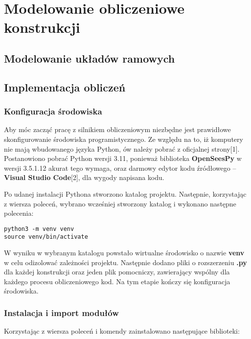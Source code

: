 \newpage
\section{Modelowanie obliczeniowe konstrukcji}

\subsection{Modelowanie układów ramowych}

\subsection{Implementacja obliczeń}
\subsubsection{Konfiguracja środowiska}

Aby móc zacząć pracę z silnikiem obliczeniowym niezbędne jest prawidłowe skonfigurowanie środowiska programistycznego.
Ze względu na to, iż komputery nie mają wbudowanego języka Python, ów należy pobrać z oficjalnej strony[1].
Postanowiono pobrać Python wersji 3.11, ponieważ biblioteka \textbf{OpenSeesPy} w wersji 3.5.1.12 akurat tego wymaga,
oraz darmowy edytor kodu źródłowego – \textbf{Visual Studio Code}[2], dla wygody napisana kodu.

Po udanej instalacji Pythona stworzono katalog projektu.
Następnie, korzystając z wiersza poleceń, wybrano wcześniej stworzony katalog i wykonano następne polecenia:

\begin{lstlisting}
python3 -m venv venv
source venv/bin/activate
\end{lstlisting}

W wyniku w wybranym katalogu powstało wirtualne środowisko o nazwie \textbf{venv} w celu odizolować zależności projektu.
Następnie dodano pliki o rozszerzeniu \textbf{.py} dla każdej konstrukcji oraz jeden plik pomocniczy, zawierający wspólny
dla każdego procesu obliczeniowego kod.
Na tym etapie kończy się konfiguracja środowiska.

\subsubsection{Instalacja i import modułów}

Korzystając z wiersza poleceń i komendy  zainstalowano następujące biblioteki:

